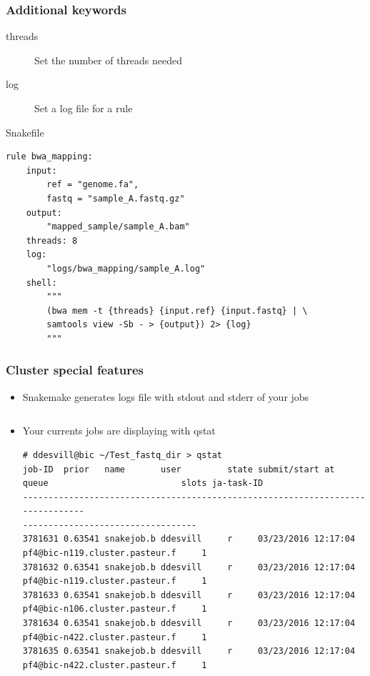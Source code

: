 \documentclass{beamer}
\begin{document}
\begin{frame}[fragile]
    \frametitle{Additional keywords}
    \begin{description}
        \item[threads] Set the number of threads needed
        \item[log] Set a log file for a rule
    \end{description}
    \begin{block}{Snakefile}
        \begin{lstlisting}
rule bwa_mapping:
    input:
        ref = "genome.fa",
        fastq = "sample_A.fastq.gz"
    output:
        "mapped_sample/sample_A.bam"
    threads: 8
    log:
        "logs/bwa_mapping/sample_A.log"
    shell:
        """
        (bwa mem -t {threads} {input.ref} {input.fastq} | \
        samtools view -Sb - > {output}) 2> {log}
        """
        \end{lstlisting}
    \end{block}
\end{frame}

\begin{frame}[fragile]
    \frametitle{Cluster special features}
    \begin{itemize}
        \item Snakemake generates logs file with stdout and stderr of your jobs
            \begin{lstlisting}
            \end{lstlisting}
        \item Your currents jobs are displaying with qstat
            \begin{lstlisting}
# ddesvill@bic ~/Test_fastq_dir > qstat
job-ID  prior   name       user         state submit/start at 
queue                          slots ja-task-ID 
-------------------------------------------------------------------------------
----------------------------------
3781631 0.63541 snakejob.b ddesvill     r     03/23/2016 12:17:04 
pf4@bic-n119.cluster.pasteur.f     1        
3781632 0.63541 snakejob.b ddesvill     r     03/23/2016 12:17:04 
pf4@bic-n119.cluster.pasteur.f     1        
3781633 0.63541 snakejob.b ddesvill     r     03/23/2016 12:17:04 
pf4@bic-n106.cluster.pasteur.f     1        
3781634 0.63541 snakejob.b ddesvill     r     03/23/2016 12:17:04 
pf4@bic-n422.cluster.pasteur.f     1        
3781635 0.63541 snakejob.b ddesvill     r     03/23/2016 12:17:04 
pf4@bic-n422.cluster.pasteur.f     1
            \end{lstlisting}
    \end{itemize}
\end{frame}
\end{document}
